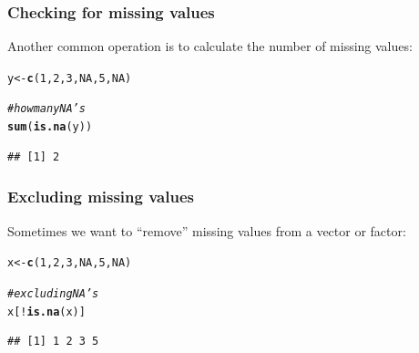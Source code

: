 \documentclass[12pt]{beamer}\usepackage[]{graphicx}\usepackage[]{color}
\makeatletter
\newcommand{\hlnum}[1]{\textcolor[rgb]{0.686,0.059,0.569}{#1}}%
\newcommand{\hlcom}[1]{\textcolor[rgb]{0.678,0.584,0.686}{\textit{#1}}}%
\newcommand{\hlopt}[1]{\textcolor[rgb]{0,0,0}{#1}}%
\newcommand{\hlstd}[1]{\textcolor[rgb]{0.345,0.345,0.345}{#1}}%
\newcommand{\hlkwb}[1]{\textcolor[rgb]{0.69,0.353,0.396}{#1}}%
\newcommand{\hlkwd}[1]{\textcolor[rgb]{0.737,0.353,0.396}{\textbf{#1}}}%
\newenvironment{kframe}{%
 \def\at@end@of@kframe{}%
 \ifinner\ifhmode%
  \def\at@end@of@kframe{\end{minipage}}%
  \begin{minipage}{\columnwidth}%
 \fi\fi%
 \def\FrameCommand##1{\hskip\@totalleftmargin \hskip-\fboxsep
 \colorbox{shadecolor}{##1}\hskip-\fboxsep
     \hskip-\linewidth \hskip-\@totalleftmargin \hskip\columnwidth}%
 \MakeFramed {\advance\hsize-\width
   \@totalleftmargin\z@ \linewidth\hsize
   \@setminipage}}%
 {\par\unskip\endMakeFramed%
 \at@end@of@kframe}
\newenvironment{knitrout}{}{} %
\makeatother
\begin{document}

\begin{frame}[fragile]
\frametitle{Checking for missing values}

Another common operation is to calculate the number of missing values:
\begin{knitrout}\footnotesize
{}\color{fgcolor}\begin{kframe}
\begin{alltt}
\hlstd{y} \hlkwb{<-} \hlkwd{c}\hlstd{(}\hlnum{1}\hlstd{,} \hlnum{2}\hlstd{,} \hlnum{3}\hlstd{,} \hlnum{NA}\hlstd{,} \hlnum{5}\hlstd{,} \hlnum{NA}\hlstd{)}

\hlcom{# how many NA's}
\hlkwd{sum}\hlstd{(}\hlkwd{is.na}\hlstd{(y))}
\end{alltt}
\begin{verbatim}
## [1] 2
\end{verbatim}
\end{kframe}
\end{knitrout}

\end{frame}


\begin{frame}[fragile]
\frametitle{Excluding missing values}

Sometimes we want to ``remove'' missing values from a vector or factor:
\begin{knitrout}\footnotesize
{}\color{fgcolor}\begin{kframe}
\begin{alltt}
\hlstd{x} \hlkwb{<-} \hlkwd{c}\hlstd{(}\hlnum{1}\hlstd{,} \hlnum{2}\hlstd{,} \hlnum{3}\hlstd{,} \hlnum{NA}\hlstd{,} \hlnum{5}\hlstd{,} \hlnum{NA}\hlstd{)}

\hlcom{# excluding NA's}
\hlstd{x[}\hlopt{!}\hlkwd{is.na}\hlstd{(x)]}
\end{alltt}
\begin{verbatim}
## [1] 1 2 3 5
\end{verbatim}
\end{kframe}
\end{knitrout}

\end{frame}

\end{document}
